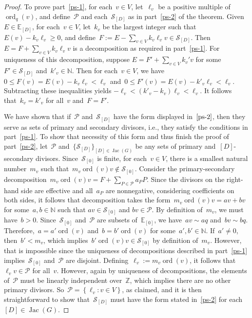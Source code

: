 \documentclass{amsart}
\DeclareMathOperator{\Jac}{Jac}
\DeclareMathOperator{\ord}{ord}
\newcommand{\primary}{\mathcal{P}}
\newcommand{\secondary}{\mathcal{S}}
\newcommand{\Z}{\mathbb{Z}}
\newcommand{\N}{\mathbb{N}}
\newcommand{\E}{\mathbb{E}}
\newcommand{\tl}{\ell}
\begin{document}
\begin{proof} To prove part~\ref{ps-1}, for each~$v\in V$, let~$\tl_v$ be a
  positive multiple of~$\ord_{q}(v)$, and define~$\primary$ and
  each~$\secondary_{[D]}$ as in part~\ref{ps-2} of the theorem.
  Given~$E\in\E_{[D]}$, for each~$v\in V$, let~$k_v$ be the largest integer such
  that~$E(v)-k_v\tl_v\geq0$, and define~$F:=E-\sum_{v\in
  V}k_v\tl_vv\in\secondary_{[D]}$.  Then $E=F+\sum_{v\in V}k_v\tl_vv$ is a
  decomposition as required in part~\ref{ps-1}.   For uniqueness of this
  decomposition, suppose $E = F' + \sum_{v\in V}k_v'v$ for
  some~$F'\in\secondary_{[D]}$ and~$k'_v\in\N$.  Then for each~$v\in V$, we
  have~$0\leq F(v)=E(v)- k_v\tl_v<\tl_v$ and~$0\leq F'(v)=E(v)-k'_v\tl_v<\tl_v$.
  Subtracting these inequalities yields $-\tl_v<(k'_v-k_v)\tl_v<\tl_v$.  It
  follows that~$k_v=k'_v$ for all~$v$ and~$F=F'$.

  We have shown that if~$\primary$ and~$\secondary_{[D]}$ have the form
  displayed in~$\ref{ps-2}$, then they serve as sets of primary and secondary
  divisors, i.e., they satisfy the conditions in part~\ref{ps-1}.  To show that
  necessity of this form and thus finish the proof of part~\ref{ps-2},
  let~$\primary$ and~$\{\secondary_{[D]}\}_{[D]\in\Jac(G)}$ be any sets of
  primary and~$[D]$-secondary divisors. Since~$\secondary_{[0]}$ is finite, for
  each~$v\in V$, there is a smallest natural number~$m_v$ such
  that~$m_v\ord(v)v\notin\secondary_{[0]}$.  Consider the primary-secondary
  decomposition~$m_v\ord(v)v=F+\sum_{P\in\primary}a_PP$. Since the divisors on
  the right-hand side are effective and all~$a_P$ are nonnegative, considering
  coefficients on both sides, it follows that decomposition takes the
  form~$m_v\ord(v)v=av+bv$ for some~$a,b\in\N$ such that $av\in\secondary_{[0]}$
  and $bv\in\primary$. By definition of~$m_v$, we must have~$b>0$.
  Since~$\secondary_{[0]}$ and~$\primary$ are subsets of~$\E_{[0]}$, we
  have~$av\sim aq$ and~$bv\sim bq$.  Therefore,~$a=a'\ord(v)$ and~$b=b'\ord(v)$
  for some~$a',b'\in\N$.  If~$a'\neq0$, then~$b'<m_v$, which
  implies~$b'\ord(v)v\in\secondary_{[0]}$ by definition of~$m_v$.  However, that
  is impossible since the uniqueness of decompositions described in
  part~\ref{ps-1} implies~$\secondary_{[0]}$ and~$\primary$ are disjoint.
  Defining~$\tl_v:=m_v\ord(v)$, it follows that~$\tl_v v\in\primary$ for
  all~$v$.  However, again by uniqueness of decompositions, the elements
  of~$\primary$ must be linearly independent over~$\Z$, which implies there are
  no other primary divisors.  So~$\primary=\left\{ \tl_v:v\in V \right\}$, as
  claimed, and it is then straightforward to show that~$\secondary_{[D]}$ must
  have the form stated in~\ref{ps-2} for each~$[D]\in\Jac(G)$.
\end{proof}
\end{document}
